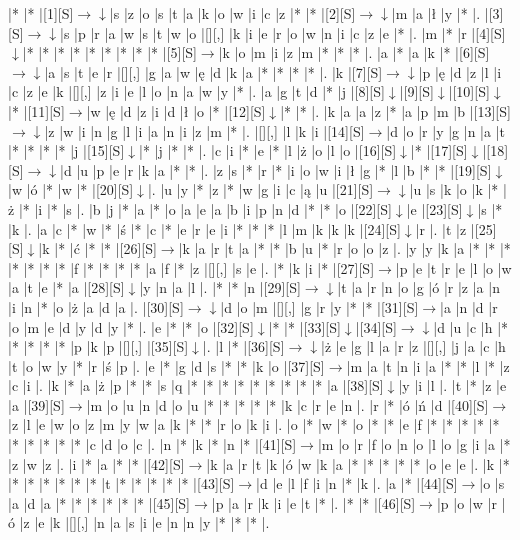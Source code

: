 \documentclass[11pt]{article}
\newcommand\drarr{$\rightarrow \!\!\!\!\! \downarrow$}
\newcommand\rarr{$\rightarrow$}
\newcommand\darr{$\downarrow$}
\begin{document}
\noindent\begin{Puzzle}{22}{29}|*	|*	|[1][S]\drarr	|s	|z	|o	|s	|t	|a	|k	|o	|w	|i	|c	|z	|*	|*	|[2][S]\drarr	|m	|a	|ł	|y	|*	|.
|[3][S]\drarr	|s	|p	|r	|a	|w	|s	|t	|w	|o	|[][,]{ }	|k	|i	|e	|r	|o	|w	|n	|i	|c	|z	|e	|*	|.
|m	|*	|r	|[4][S]\darr	|*	|*	|*	|*	|*	|*	|*	|*	|*	|[5][S]\rarr	|k	|o	|m	|i	|z	|m	|*	|*	|*	|.
|a	|*	|a	|k	|*	|[6][S]\drarr	|a	|s	|t	|e	|r	|[][,]{ }	|g	|a	|w	|ę	|d	|k	|a	|*	|*	|*	|*	|.
|k	|[7][S]\drarr	|p	|ę	|d	|z	|l	|i	|c	|z	|e	|k	|[][,]{ }	|z	|i	|e	|l	|o	|n	|a	|w	|y	|*	|.
|a	|g	|t	|d	|*	|j	|[8][S]\darr	|[9][S]\darr	|[10][S]\darr	|*	|[11][S]\rarr	|w	|ę	|d	|z	|i	|d	|ł	|o	|*	|[12][S]\darr	|*	|*	|.
|k	|a	|a	|z	|*	|a	|p	|m	|b	|[13][S]\drarr	|z	|w	|i	|n	|g	|l	|i	|a	|n	|i	|z	|m	|*	|.
|[][,]{ }	|l	|k	|i	|[14][S]\rarr	|d	|o	|r	|y	|g	|n	|a	|t	|*	|*	|*	|*	|j	|[15][S]\darr	|*	|j	|*	|*	|.
|c	|i	|*	|e	|*	|l	|ż	|o	|l	|o	|[16][S]\darr	|*	|[17][S]\darr	|[18][S]\drarr	|d	|u	|p	|e	|r	|k	|a	|*	|*	|.
|z	|s	|*	|r	|*	|i	|o	|w	|i	|ł	|g	|*	|l	|b	|*	|*	|[19][S]\darr	|w	|ó	|*	|w	|*	|[20][S]\darr	|.
|u	|y	|*	|z	|*	|w	|g	|i	|c	|ą	|u	|[21][S]\drarr	|u	|s	|k	|o	|k	|*	|ż	|*	|i	|*	|s	|.
|b	|j	|*	|a	|*	|o	|a	|e	|a	|b	|i	|p	|n	|d	|*	|*	|o	|[22][S]\darr	|e	|[23][S]\darr	|s	|*	|k	|.
|a	|c	|*	|w	|*	|ś	|*	|c	|*	|e	|r	|e	|i	|*	|*	|*	|l	|m	|k	|k	|k	|[24][S]\darr	|r	|.
|t	|z	|[25][S]\darr	|k	|*	|ć	|*	|*	|[26][S]\rarr	|k	|a	|r	|t	|a	|*	|*	|b	|u	|*	|r	|o	|o	|z	|.
|y	|y	|k	|a	|*	|*	|*	|*	|*	|*	|*	|f	|*	|*	|*	|*	|a	|f	|*	|z	|[][,]{ }	|s	|e	|.
|*	|k	|i	|*	|[27][S]\rarr	|p	|e	|t	|r	|e	|l	|o	|w	|a	|t	|e	|*	|a	|[28][S]\darr	|y	|n	|a	|l	|.
|*	|*	|n	|[29][S]\drarr	|t	|a	|r	|n	|o	|g	|ó	|r	|z	|a	|n	|i	|n	|*	|o	|ż	|a	|d	|a	|.
|[30][S]\drarr	|d	|o	|m	|[][,]{ }	|g	|r	|y	|*	|*	|[31][S]\rarr	|a	|n	|d	|r	|o	|m	|e	|d	|y	|d	|y	|*	|.
|e	|*	|*	|o	|[32][S]\darr	|*	|*	|[33][S]\darr	|[34][S]\drarr	|d	|u	|c	|h	|*	|*	|*	|*	|*	|p	|k	|p	|[][,]{ }	|[35][S]\darr	|.
|l	|*	|[36][S]\drarr	|ż	|e	|g	|l	|a	|r	|z	|[][,]{ }	|j	|a	|c	|h	|t	|o	|w	|y	|*	|r	|ś	|p	|.
|e	|*	|g	|d	|s	|*	|*	|k	|o	|[37][S]\rarr	|m	|a	|t	|n	|i	|a	|*	|*	|l	|*	|z	|c	|i	|.
|k	|*	|a	|ż	|p	|*	|*	|s	|q	|*	|*	|*	|*	|*	|*	|*	|*	|*	|a	|[38][S]\darr	|y	|i	|l	|.
|t	|*	|z	|e	|a	|[39][S]\rarr	|m	|o	|u	|n	|d	|o	|u	|*	|*	|*	|*	|*	|k	|c	|r	|e	|n	|.
|r	|*	|ó	|ń	|d	|[40][S]\rarr	|z	|l	|e	|w	|o	|z	|m	|y	|w	|a	|k	|*	|*	|r	|o	|k	|i	|.
|o	|*	|w	|*	|o	|*	|*	|e	|f	|*	|*	|*	|*	|*	|*	|*	|*	|*	|*	|c	|d	|o	|c	|.
|n	|*	|k	|*	|n	|*	|[41][S]\rarr	|m	|o	|r	|f	|o	|n	|o	|l	|o	|g	|i	|a	|*	|z	|w	|z	|.
|i	|*	|a	|*	|*	|[42][S]\rarr	|k	|a	|r	|t	|k	|ó	|w	|k	|a	|*	|*	|*	|*	|*	|o	|e	|e	|.
|k	|*	|*	|*	|*	|*	|*	|*	|t	|*	|*	|*	|*	|*	|[43][S]\rarr	|d	|e	|l	|f	|i	|n	|*	|k	|.
|a	|*	|[44][S]\rarr	|o	|s	|a	|d	|a	|*	|*	|*	|*	|*	|*	|[45][S]\rarr	|p	|a	|r	|k	|i	|e	|t	|*	|.
|*	|*	|[46][S]\rarr	|p	|o	|w	|r	|ó	|z	|e	|k	|[][,]{ }	|n	|a	|s	|i	|e	|n	|n	|y	|*	|*	|*	|.\end{Puzzle}
\end{document}
